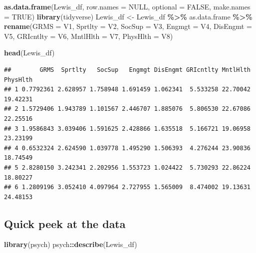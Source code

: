 \documentclass[
  11pt,
]{book}
\newenvironment{Shaded}{\begin{snugshade}}{\end{snugshade}}
\newcommand{\AttributeTok}[1]{\textcolor[rgb]{0.27,0.27,0.27}{#1}}
\newcommand{\ConstantTok}[1]{\textcolor[rgb]{0.37,0.37,0.37}{#1}}
\newcommand{\FunctionTok}[1]{\textcolor[rgb]{0.27,0.27,0.27}{\textbf{#1}}}
\newcommand{\NormalTok}[1]{#1}
\newcommand{\OtherTok}[1]{\textcolor[rgb]{0.37,0.37,0.37}{#1}}
\newcommand{\SpecialCharTok}[1]{\textcolor[rgb]{0.43,0.43,0.43}{\textbf{#1}}}
\begin{document}
\begin{Shaded}
\begin{Highlighting}[]
\FunctionTok{as.data.frame}\NormalTok{(Lewis\_df, }\AttributeTok{row.names =} \ConstantTok{NULL}\NormalTok{, }\AttributeTok{optional =} \ConstantTok{FALSE}\NormalTok{, }\AttributeTok{make.names =} \ConstantTok{TRUE}\NormalTok{)}
\FunctionTok{library}\NormalTok{(tidyverse)}
\NormalTok{Lewis\_df }\OtherTok{\textless{}{-}}\NormalTok{ Lewis\_df }\SpecialCharTok{\%\textgreater{}\%}
\NormalTok{    as.data.frame }\SpecialCharTok{\%\textgreater{}\%}
    \FunctionTok{rename}\NormalTok{(}\AttributeTok{GRMS =}\NormalTok{ V1, }\AttributeTok{Sprtlty =}\NormalTok{ V2, }\AttributeTok{SocSup =}\NormalTok{ V3, }\AttributeTok{Engmgt =}\NormalTok{ V4, }\AttributeTok{DisEngmt =}\NormalTok{ V5,}
        \AttributeTok{GRIcntlty =}\NormalTok{ V6, }\AttributeTok{MntlHlth =}\NormalTok{ V7, }\AttributeTok{PhysHlth =}\NormalTok{ V8)}
\end{Highlighting}
\end{Shaded}

\begin{Shaded}
\begin{Highlighting}[]
\FunctionTok{head}\NormalTok{(Lewis\_df)}
\end{Highlighting}
\end{Shaded}

\begin{verbatim}
##        GRMS  Sprtlty   SocSup   Engmgt DisEngmt GRIcntlty MntlHlth PhysHlth
## 1 0.7792361 2.628957 1.758948 1.691459 1.062341  5.533258 22.70042 19.42231
## 2 1.5729406 1.943789 1.101567 2.446707 1.885076  5.806530 22.67086 22.25516
## 3 1.9586843 3.039406 1.591625 2.428866 1.635518  5.166721 19.06958 23.23199
## 4 0.6532324 2.624590 1.039778 1.495290 1.506393  4.276244 23.90836 18.74549
## 5 2.8280150 3.242341 2.202956 1.553723 1.024422  5.730293 22.86224 18.80227
## 6 1.2809196 3.052410 4.097964 2.727955 1.565009  8.474002 19.13631 24.48153
\end{verbatim}

\hypertarget{quick-peek-at-the-data}{%
\subsection{Quick peek at the data}\label{quick-peek-at-the-data}}

\begin{Shaded}
\begin{Highlighting}[]
\FunctionTok{library}\NormalTok{(psych)}
\NormalTok{psych}\SpecialCharTok{::}\FunctionTok{describe}\NormalTok{(Lewis\_df)}
\end{Highlighting}
\end{Shaded}
\end{document}
